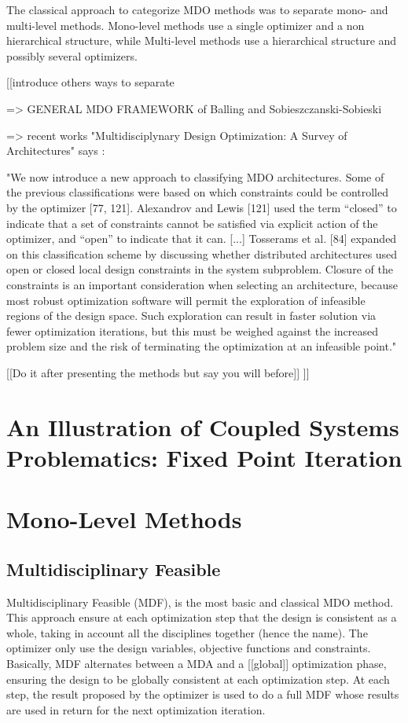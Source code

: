 The classical approach to categorize MDO methods was to separate mono- and multi-level methods.
Mono-level methods use a single optimizer and a non hierarchical structure, while Multi-level methods use a hierarchical structure and possibly several optimizers.

[[introduce others ways to separate

=> GENERAL MDO FRAMEWORK of Balling and Sobieszczanski-Sobieski

=> recent works "Multidisciplynary Design Optimization: A Survey of Architectures" says : 

"We now introduce a new approach to classifying MDO architectures. Some of the previous classifications were based on which constraints could be controlled by the optimizer [77, 121]. Alexandrov and Lewis [121] used the term “closed” to indicate that a set of constraints cannot be satisfied via explicit action of the optimizer, and “open” to indicate that it can.
[...]
Tosserams et al. [84] expanded on this classification
scheme by discussing whether distributed architectures used open or closed local design constraints in the system subproblem. Closure of the constraints is an important consideration when selecting an architecture, because most robust optimization software will permit the exploration of infeasible regions of the design space. Such exploration can result in faster solution via fewer optimization iterations, but this must be weighed against the increased problem size and the risk of terminating the optimization at an infeasible point."


[[Do it after presenting the methods but say you will before]]
]]

\section{An Illustration of Coupled Systems Problematics: Fixed Point Iteration}

\section{Mono-Level Methods}

\subsection{Multidisciplinary Feasible}

Multidisciplinary Feasible (MDF), is the most basic and classical MDO method. This approach ensure at each optimization step that the design is consistent as a whole, taking in account all the disciplines together (hence the name). The optimizer only use the design variables, objective functions and constraints.
Basically, MDF alternates between a MDA and a [[global]] optimization phase, ensuring the design to be globally consistent at each optimization step. At each step, the result proposed by the optimizer is used to do a full MDF whose results are used in return for the next optimization iteration.

